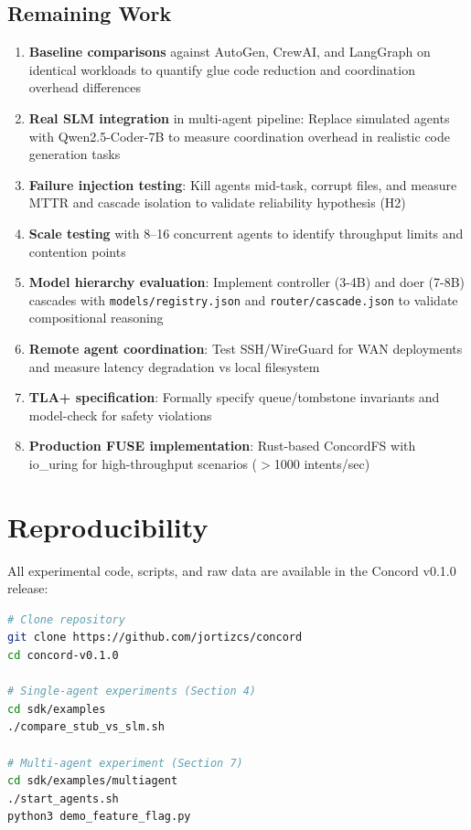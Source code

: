 \documentclass[11pt]{article}
\begin{document}
\subsection{Remaining Work}

\begin{enumerate}
\item \textbf{Baseline comparisons} against AutoGen, CrewAI, and LangGraph on identical workloads to quantify glue code reduction and coordination overhead differences

\item \textbf{Real SLM integration} in multi-agent pipeline: Replace simulated agents with Qwen2.5-Coder-7B to measure coordination overhead in realistic code generation tasks

\item \textbf{Failure injection testing}: Kill agents mid-task, corrupt files, and measure MTTR and cascade isolation to validate reliability hypothesis (H2)

\item \textbf{Scale testing} with 8--16 concurrent agents to identify throughput limits and contention points

\item \textbf{Model hierarchy evaluation}: Implement controller (3-4B) and doer (7-8B) cascades with \texttt{models/registry.json} and \texttt{router/cascade.json} to validate compositional reasoning

\item \textbf{Remote agent coordination}: Test SSH/WireGuard for WAN deployments and measure latency degradation vs local filesystem

\item \textbf{TLA+ specification}: Formally specify queue/tombstone invariants and model-check for safety violations

\item \textbf{Production FUSE implementation}: Rust-based ConcordFS with io\_uring for high-throughput scenarios ($>$1000 intents/sec)
\end{enumerate}

\section{Reproducibility}

All experimental code, scripts, and raw data are available in the Concord v0.1.0 release:

\begin{lstlisting}[language=bash]
# Clone repository
git clone https://github.com/jortizcs/concord
cd concord-v0.1.0

# Single-agent experiments (Section 4)
cd sdk/examples
./compare_stub_vs_slm.sh

# Multi-agent experiment (Section 7)
cd sdk/examples/multiagent
./start_agents.sh
python3 demo_feature_flag.py
\end{lstlisting}
\end{document}
